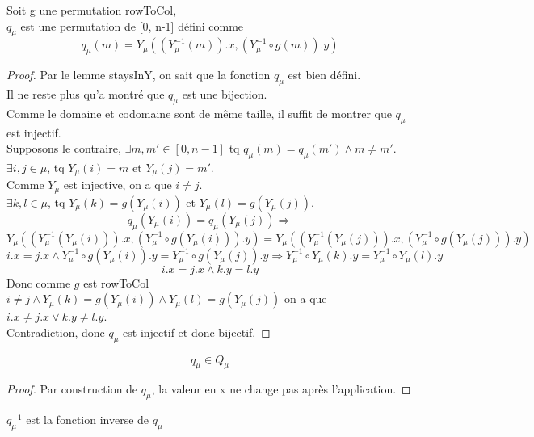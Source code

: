 \begin{definition}[qu]
    \label{qu}
    \leanok
    Soit g une permutation rowToCol,\\
    $q_{\mu}$ est une permutation de [0, n-1] défini comme
    \[ q_{\mu}(m)= Y_{\mu}((Y_{\mu}^{-1}(m)).x,(Y_{\mu}^{-1} \circ g(m)).y) \]
\end{definition}
\begin{proof}
    \leanok
    Par le lemme staysInY, on sait que la fonction $q_{\mu}$ est bien défini.\\
    Il ne reste plus qu'a montré que $q_{\mu}$ est une bijection.\\
    Comme le domaine et codomaine sont de même taille, il suffit de montrer que $q_{\mu}$ est injectif.\\
    Supposons le contraire, $\exists m, m' \in [0,n-1]$ tq $q_{\mu}(m) = q_{\mu}(m') \land m \neq m'$.\\
    $\exists i, j \in \mu$, tq $Y_{\mu}(i)=m$ et $Y_{\mu}(j)=m'$.\\
    Comme $Y_{\mu}$ est injective, on a que $i \neq j$.\\
    $\exists k, l \in \mu$, tq $Y_{\mu}(k)=g(Y_{\mu}(i))$ et $Y_{\mu}(l)=g(Y_{\mu}(j))$.\\
    \[ q_{\mu}(Y_{\mu}(i)) = q_{\mu}(Y_{\mu}(j)) \Rightarrow \]
    \[ Y_{\mu}((Y_{\mu}^{-1}(Y_{\mu}(i))).x,(Y_{\mu}^{-1} \circ g(Y_{\mu}(i))).y) = Y_{\mu}((Y_{\mu}^{-1}(Y_{\mu}(j))).x,(Y_{\mu}^{-1} \circ g(Y_{\mu}(j))).y) \]
    \[ i.x = j.x \land Y_{\mu}^{-1} \circ g(Y_{\mu}(i)).y = Y_{\mu}^{-1} \circ g(Y_{\mu}(j)).y \Rightarrow Y_{\mu}^{-1} \circ Y_{\mu}(k).y = Y_{\mu}^{-1} \circ Y_{\mu}(l).y \]
    \[ i.x = j.x \land k.y = l.y \]
    Donc comme $g$ est rowToCol $i \neq j \land Y_{\mu}(k)=g(Y_{\mu}(i)) \land Y_{\mu}(l)=g(Y_{\mu}(j))$ on a que $i.x \neq j.x \lor k.y \neq l.y$.\\
    Contradiction, donc $q_{\mu}$ est injectif et donc bijectif.
\end{proof}

\begin{lemma}[quInQu]
    \label{quInQu}
    \leanok
    \[ q_{\mu} \in Q_{\mu} \]
\end{lemma}
\begin{proof}
    \leanok
    Par construction de $q_{\mu}$, la valeur en x ne change pas après l'application.
\end{proof}

\begin{definition}[quInv]
    \label{quInv}
    \leanok
    $q_{\mu}^{-1}$ est la fonction inverse de $q_{\mu}$
\end{definition}

